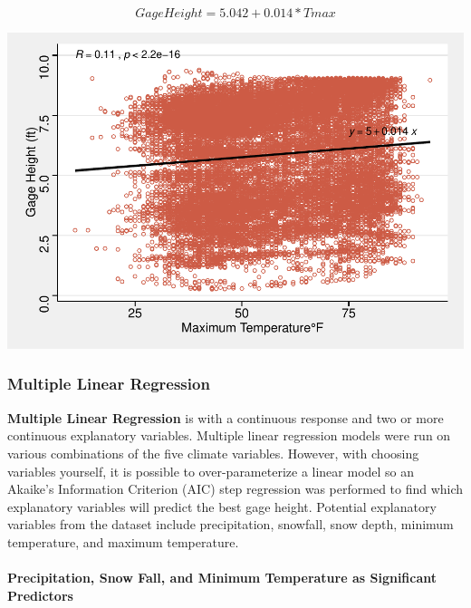 \documentclass[12pt,]{article}
\let\oldparagraph\paragraph
\renewcommand{\paragraph}[1]{\oldparagraph{#1}\mbox{}}
\let\origfigure\figure
\let\endorigfigure\endfigure
\renewenvironment{figure}[1][2] {
    \expandafter\origfigure\expandafter[H]
} {
    \endorigfigure
}
\begin{document}
\[Gage Height = 5.042 + 0.014*Tmax \]

\begin{figure}
\centering
\includegraphics{Shintaku_ENV872_Project_files/figure-latex/unnamed-chunk-14-1.pdf}
\caption{Maximum temperature by gage height with trend line in black}
\end{figure}

\hypertarget{multiple-linear-regression}{%
\subsubsection{Multiple Linear
Regression}\label{multiple-linear-regression}}

\textbf{Multiple Linear Regression} is with a continuous response and
two or more continuous explanatory variables. Multiple linear regression
models were run on various combinations of the five climate variables.
However, with choosing variables yourself, it is possible to
over-parameterize a linear model so an Akaike's Information Criterion
(AIC) step regression was performed to find which explanatory variables
will predict the best gage height. Potential explanatory variables from
the dataset include precipitation, snowfall, snow depth, minimum
temperature, and maximum temperature.

\hypertarget{precipitation-snow-fall-and-minimum-temperature-as-significant-predictors}{%
\paragraph{Precipitation, Snow Fall, and Minimum Temperature as
Significant
Predictors}\label{precipitation-snow-fall-and-minimum-temperature-as-significant-predictors}}
\end{document}
